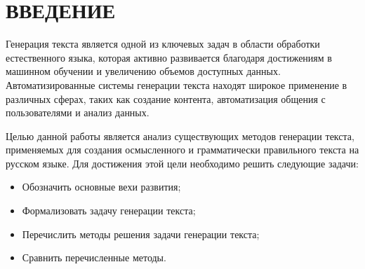 \chapter*{ВВЕДЕНИЕ}

Генерация текста является одной из ключевых задач в области обработки естественного языка, которая активно развивается благодаря достижениям в машинном обучении и увеличению объемов доступных данных. Автоматизированные системы генерации текста находят широкое применение в различных сферах, таких как создание контента, автоматизация общения с пользователями и анализ данных.

Целью данной работы является анализ существующих методов генерации текста, применяемых для создания осмысленного и грамматически правильного текста на русском языке. Для достижения этой цели необходимо решить следующие задачи:
\begin{itemize}
    \item[---] Обозначить основные вехи развития; 
    \item[---] Формализовать задачу генерации текста;
    \item[---] Перечислить методы решения задачи генерации текста;
    \item[---] Сравнить перечисленные методы.
\end{itemize}
